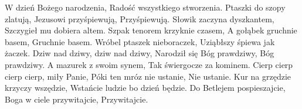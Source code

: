 \beginverse
W dzień Bożego narodzenia,
Radość wszystkiego stworzenia.
Ptaszki do szopy zlatują,
Jezusowi przyśpiewują,
Przyśpiewują.
\endverse
\beginverse
Słowik zaczyna dyszkantem,
Szczygieł mu dobiera altem.
Szpak tenorem krzyknie czasem,
A gołąbek gruchnie basem,
Gruchnie basem.
\endverse
\beginverse
Wróbel ptaszek nieboraczek,
Uziąbłszy śpiewa jak żaczek.
Dziw nad dziwy, dziw nad dziwy,
Narodził się Bóg prawdziwy,
Bóg prawdziwy.
\endverse
\beginverse
A mazurek z swoim synem,
Tak świergocze za kominem.
Cierp cierp cierp cierp, miły Panie,
Póki ten mróz nie ustanie,
Nie ustanie.
\endverse
\beginverse
Kur na grzędzie krzyczy wszędzie,
Wstańcie ludzie bo dzień będzie.
Do Betlejem pospieszajcie,
Boga w ciele przywitajcie,
Przywitajcie.
\endverse
\endsong